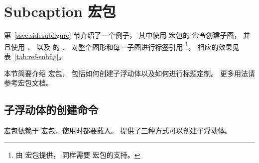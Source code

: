 \section{Subcaption 宏包}\label{sec:subcaption-pkg}

第~\ref{ssec:sidesubfigure} 节介绍了一个例子，
其中使用  宏包的  命令创建子图，
并且使用 、 以及  的 、 对整个图形和每一子图进行标签引用
\footnote{
	 由  宏包提供， 同样需要  宏包的支持。}，
相应的效果见表~\ref{tab:ref-subfig}。

本节简要介绍  宏包，
包括如何创建子浮动体以及如何进行标题定制。
更多用法请参考宏包文档\cite{subcaption-doc}。

\subsection{子浮动体的创建命令}

 宏包依赖于  宏包，使用时都要载入。
 提供了三种方式可以创建子浮动体。


